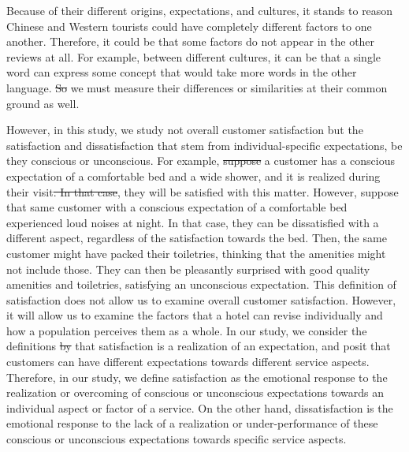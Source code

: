 \documentclass[smallextended,natbib]{svjour3}       %
\providecommand{\DIFadd}[1]{{\protect\color{blue}\uwave{#1}}} %
\providecommand{\DIFdel}[1]{{\protect\color{red}\sout{#1}}}                      %
\providecommand{\DIFaddbegin}{} %
\providecommand{\DIFaddend}{} %
\providecommand{\DIFdelbegin}{} %
\providecommand{\DIFdelend}{} %
\newcommand{\DIFscaledelfig}{0.5}
\newlength{\DIFdelgraphicswidth} %
\newlength{\DIFdelgraphicsheight} %
\newcommand{\DIFaddincludegraphics}[2][]{{\color{blue}\fbox{\DIFOincludegraphics[#1]{#2}}}} %
\newcommand{\DIFdelincludegraphics}[2][]{%
\sbox{\DIFdelgraphicsbox}{\DIFOincludegraphics[#1]{#2}}%
\settoboxwidth{\DIFdelgraphicswidth}{\DIFdelgraphicsbox} %
\settoboxtotalheight{\DIFdelgraphicsheight}{\DIFdelgraphicsbox} %
\scalebox{\DIFscaledelfig}{%
\parbox[b]{\DIFdelgraphicswidth}{\usebox{\DIFdelgraphicsbox}\\[-\baselineskip] \rule{\DIFdelgraphicswidth}{0em}}\llap{\resizebox{\DIFdelgraphicswidth}{\DIFdelgraphicsheight}{%
\setlength{\unitlength}{\DIFdelgraphicswidth}%
\begin{picture}(1,1)%
\thicklines\linethickness{2pt} %
{\color[rgb]{1,0,0}\put(0,0){\framebox(1,1){}}}%
{\color[rgb]{1,0,0}\put(0,0){\line( 1,1){1}}}%
{\color[rgb]{1,0,0}\put(0,1){\line(1,-1){1}}}%
\end{picture}%
}\hspace*{3pt}}} %
} %
\DeclareRobustCommand{\DIFaddbegin}{\DIFOaddbegin \let\includegraphics\DIFaddincludegraphics} %
\DeclareRobustCommand{\DIFaddend}{\DIFOaddend \let\includegraphics\DIFOincludegraphics} %
\DeclareRobustCommand{\DIFdelbegin}{\DIFOdelbegin \let\includegraphics\DIFdelincludegraphics} %
\DeclareRobustCommand{\DIFdelend}{\DIFOaddend \let\includegraphics\DIFOincludegraphics} %
\begin{document}
    Because of their different origins, expectations, and cultures, it stands to reason Chinese and Western tourists could have completely different factors to one another. Therefore, it could be that some factors do not appear in the other reviews at all. For example, between different cultures, it can be that a single word can express some concept that would take more words in the other language. \DIFdelbegin \DIFdel{So }\DIFdelend \DIFaddbegin \DIFadd{Therefore, }\DIFaddend we must measure their differences or similarities at their common ground as well.

    However, in this study, we study not overall customer satisfaction but the satisfaction and dissatisfaction that stem from individual-specific expectations, be they conscious or unconscious. For example, \DIFdelbegin \DIFdel{suppose }\DIFdelend \DIFaddbegin \DIFadd{if }\DIFaddend a customer has a conscious expectation of a comfortable bed and a wide shower, and it is realized during their visit\DIFdelbegin \DIFdel{. In that case}\DIFdelend , they will be satisfied with this matter. However, suppose that same customer with a conscious expectation of a comfortable bed experienced loud noises at night. In that case, they can be dissatisfied with a different aspect, regardless of the satisfaction towards the bed. Then, the same customer might have packed their toiletries, thinking that the amenities might not include those. They can then be pleasantly surprised with good quality amenities and toiletries, satisfying an unconscious expectation. This definition of satisfaction does not allow us to examine overall customer satisfaction. However, it will allow us to examine the factors that a hotel can revise individually and how a population perceives them as a whole. In our study, we consider the definitions \DIFdelbegin \DIFdel{by }\DIFdelend \DIFaddbegin \DIFadd{in }\DIFaddend \cite{hunt1975} that satisfaction is a realization of an expectation, and \DIFaddbegin \DIFadd{we }\DIFaddend posit that customers can have different expectations towards different service aspects. Therefore, in our study, we define satisfaction as the emotional response to the realization or overcoming of conscious or unconscious expectations towards an individual aspect or factor of a service. On the other hand, dissatisfaction is the emotional response to the lack of a realization or under-performance of these conscious or unconscious expectations towards specific service aspects.
\end{document}
